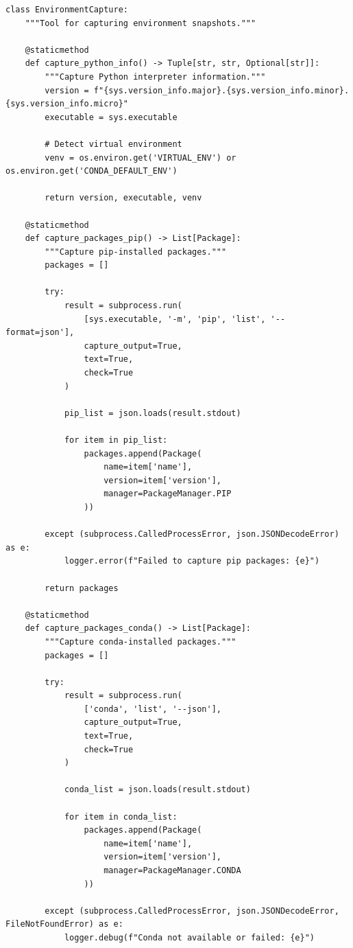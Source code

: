 \begin{lstlisting}[style=python, caption={Complete environment snapshot system}]
class EnvironmentCapture:
    """Tool for capturing environment snapshots."""

    @staticmethod
    def capture_python_info() -> Tuple[str, str, Optional[str]]:
        """Capture Python interpreter information."""
        version = f"{sys.version_info.major}.{sys.version_info.minor}.{sys.version_info.micro}"
        executable = sys.executable

        # Detect virtual environment
        venv = os.environ.get('VIRTUAL_ENV') or os.environ.get('CONDA_DEFAULT_ENV')

        return version, executable, venv

    @staticmethod
    def capture_packages_pip() -> List[Package]:
        """Capture pip-installed packages."""
        packages = []

        try:
            result = subprocess.run(
                [sys.executable, '-m', 'pip', 'list', '--format=json'],
                capture_output=True,
                text=True,
                check=True
            )

            pip_list = json.loads(result.stdout)

            for item in pip_list:
                packages.append(Package(
                    name=item['name'],
                    version=item['version'],
                    manager=PackageManager.PIP
                ))

        except (subprocess.CalledProcessError, json.JSONDecodeError) as e:
            logger.error(f"Failed to capture pip packages: {e}")

        return packages

    @staticmethod
    def capture_packages_conda() -> List[Package]:
        """Capture conda-installed packages."""
        packages = []

        try:
            result = subprocess.run(
                ['conda', 'list', '--json'],
                capture_output=True,
                text=True,
                check=True
            )

            conda_list = json.loads(result.stdout)

            for item in conda_list:
                packages.append(Package(
                    name=item['name'],
                    version=item['version'],
                    manager=PackageManager.CONDA
                ))

        except (subprocess.CalledProcessError, json.JSONDecodeError, FileNotFoundError) as e:
            logger.debug(f"Conda not available or failed: {e}")


\end{lstlisting}
